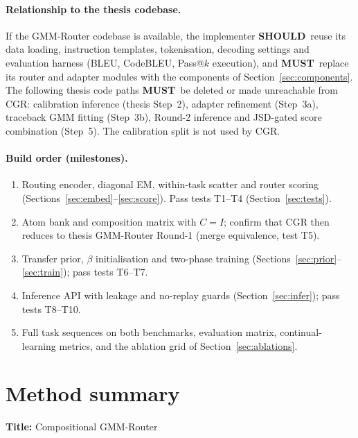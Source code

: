 \documentclass[11pt]{article}
\newcommand{\MUST}{\textbf{MUST}}
\newcommand{\SHOULD}{\textbf{SHOULD}}
\begin{document}
\paragraph{Relationship to the thesis codebase.} If the GMM-Router codebase is available, the implementer
\SHOULD\ reuse its data loading, instruction templates, tokenisation, decoding settings and evaluation harness
(BLEU, CodeBLEU, Pass@$k$ execution), and \MUST\ replace its router and adapter modules with the components of
Section~\ref{sec:components}. The following thesis code paths \MUST\ be deleted or made unreachable from CGR:
calibration inference (thesis Step~2), adapter refinement (Step~3a), traceback GMM fitting (Step~3b), Round-2
inference and JSD-gated score combination (Step~5). The calibration split is not used by CGR.

\paragraph{Build order (milestones).}
\begin{enumerate}[label=M\arabic*., leftmargin=*]
  \item Routing encoder, diagonal EM, within-task scatter and router scoring (Sections~\ref{sec:embed}--\ref{sec:score}).
        Pass tests T1--T4 (Section~\ref{sec:tests}).
  \item Atom bank and composition matrix with $C=I$; confirm that CGR then reduces to thesis GMM-Router Round-1
        (merge equivalence, test T5).
  \item Transfer prior, $\beta$ initialisation and two-phase training (Sections~\ref{sec:prior}--\ref{sec:train});
        pass tests T6--T7.
  \item Inference API with leakage and no-replay guards (Section~\ref{sec:infer}); pass tests T8--T10.
  \item Full task sequences on both benchmarks, evaluation matrix, continual-learning metrics, and the ablation
        grid of Section~\ref{sec:ablations}.
\end{enumerate}

\section{Method summary}

\noindent\textbf{Title:} Compositional GMM-Router
\end{document}
